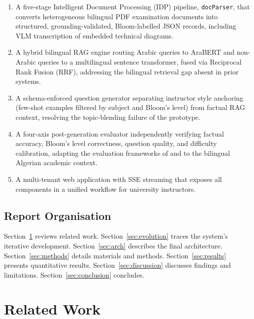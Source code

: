 \documentclass[12pt, a4paper]{article}
\begin{document}
\begin{enumerate}[leftmargin=2em]
  \item A five-stage Intelligent Document Processing (IDP) pipeline, \texttt{docParser},
  that converts heterogeneous bilingual PDF examination documents into structured,
  grounding-validated, Bloom-labelled JSON records, including VLM transcription of
  embedded technical diagrams.

  \item A hybrid bilingual RAG engine routing Arabic queries to AraBERT and
  non-Arabic queries to a multilingual sentence transformer, fused via Reciprocal
  Rank Fusion (RRF), addressing the bilingual retrieval gap absent in prior systems.

  \item A schema-enforced question generator separating instructor style anchoring
  (few-shot examples filtered by subject and Bloom's level) from factual RAG context,
  resolving the topic-blending failure of the prototype.

  \item A four-axis post-generation evaluator independently verifying factual
  accuracy, Bloom's level correctness, question quality, and difficulty calibration,
  adapting the evaluation frameworks of \citet{mucciaccia2025mcq} and
  \citet{isley2025quality} to the bilingual Algerian academic context.

  \item A multi-tenant web application with SSE streaming that exposes all components
  in a unified workflow for university instructors.
\end{enumerate}

\subsection{Report Organisation}

Section~\ref{sec:related} reviews related work.
Section~\ref{sec:evolution} traces the system's iterative development.
Section~\ref{sec:arch} describes the final architecture.
Section~\ref{sec:methods} details materials and methods.
Section~\ref{sec:results} presents quantitative results.
Section~\ref{sec:discussion} discusses findings and limitations.
Section~\ref{sec:conclusion} concludes.

\section{Related Work}
\label{sec:related}
\end{document}
